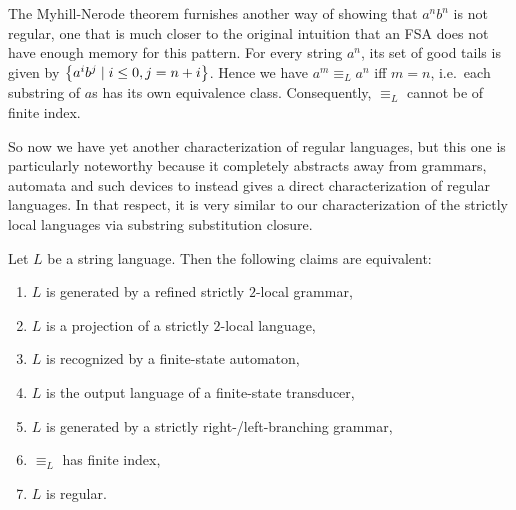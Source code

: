 The Myhill-Nerode theorem furnishes another way of showing that $a^n b^n$ is not regular, one that is much closer to the original intuition that an FSA does not have enough memory for this pattern.
For every string $a^n$, its set of good tails is given by $\left \{ a^i b^j \mid i \leq 0, j = n+i \right \}$.
Hence we have $a^m \equiv_L a^n$ iff $m = n$, i.e.\ each substring of $a$s has its own equivalence class.
Consequently, $\equiv_L$ cannot be of finite index.

So now we have yet another characterization of regular languages, but this one is particularly noteworthy because it completely abstracts away from grammars, automata and such devices to instead gives a direct characterization of regular languages. 
In that respect, it is very similar to our characterization of the strictly local languages via substring substitution closure.
%
\begin{corollary}
    Let $L$ be a string language.
    Then the following claims are equivalent:
    \begin{enumerate}
        \item $L$ is generated by a refined strictly $2$-local grammar,
        \item $L$ is a projection of a strictly $2$-local language,
        \item $L$ is recognized by a finite-state automaton,
        \item $L$ is the output language of a finite-state transducer,
        \item $L$ is generated by a strictly right-\slash left-branching grammar,
        \item $\equiv_L$ has finite index,
        \item $L$ is regular.
    \end{enumerate}
\end{corollary}
